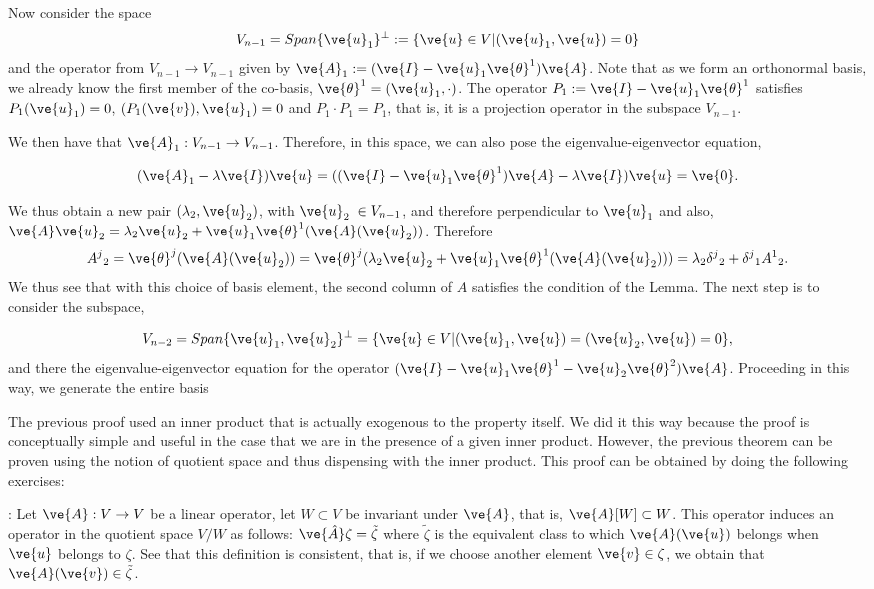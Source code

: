 Now consider the space 
\[
V_{n-1} = Span\{\ve{u}_1\}^{\perp} := \{\ve{u} \in V | (\ve{u}_1,\ve{u}) = 0 \}
\]
and the operator from $V_{n-1} \to V_{n-1}$ given by $\ve{A}_1 :=(\ve{I} - \ve{u}_1 \ve{\theta}^1)\ve{A}$.
%
Note that as we form an orthonormal basis, we already know the first member of the co-basis, $\ve{\theta}^1 = (\ve{u}_1,\cdot)$.
%
The operator $P_1:=\ve{I} - \ve{u}_1 \ve{\theta}^1$ satisfies $P_1(\ve{u}_1)=0$, 
$(P_1(\ve{v}),\ve{u}_1)=0$ and $P_1\cdot P_1 = P_1$, that is, it is a projection operator in the subspace $V_{n-1}$.

We then have that $\ve{A}_1 : V_{n-1} \to V_{n-1}$. Therefore, in this space, we can also pose the eigenvalue-eigenvector equation, 

\begin{equation}
(\ve{A}_1 - \lambda \ve{I})\ve{u} = ((\ve{I} - \ve{u}_1 \ve{\theta}^1)\ve{A} - \lambda \ve{I})\ve{u} = \ve{0}.
\end{equation}
%

We thus obtain a new pair $(\lambda_2,\ve{u}_2)$, with $\ve{u}_2 \;\in V_{n-1}$, and therefore perpendicular
to $\ve{u}_1$ and also,
$\ve{A} \ve{u}_2 = \lambda_2 \ve{u}_2 + \ve{u}_1 \ve{\theta}^1(\ve{A}(\ve{u}_2))$.
Therefore 
\[
A^j{}_2 = \ve{\theta}^j(\ve{A}(\ve{u}_2))
         = \ve{\theta}^j(\lambda_2 \ve{u}_2 + \ve{u}_1 \ve{\theta}^1(\ve{A}(\ve{u}_2)))
         = \lambda_2 \delta^j{}_2 + \delta^j{}_1 A^1{}_2.
\]
%
We thus see that with this choice of basis element, the second column of $A$ satisfies the condition of the Lemma.
The next step is to consider the subspace,

\[
V_{n-2} = Span\{\ve{u}_1, \ve{u}_2\}^{\perp}
        = \{\ve{u} \in V | (\ve{u}_1,\ve{u}) = (\ve{u}_2,\ve{u}) = 0 \},
\]
%
and there the eigenvalue-eigenvector equation for the operator
$(\ve{I} - \ve{u}_1 \ve{\theta}^1 - \ve{u}_2 \ve{\theta}^2)\ve{A}$.
Proceeding in this way, we generate the entire basis\epru
\espa

The previous proof used an inner product that is actually exogenous to the property itself.
We did it this way because the proof is conceptually simple and useful in the case that we are in the presence of a given inner product.
However, the previous theorem can be proven using the notion of quotient space and thus dispensing with the inner product. 
This proof can be obtained by doing the following exercises:

\ejer: Let $\ve{A}: V \to V$ be a linear operator, let $W\subset V$ be invariant under $\ve{A}$, that is, $\ve{A}[W]\subset W$.
This operator induces an operator in the quotient space $V/W$ as follows: 
$\ve{\hat{A}}\zeta = \tilde{\zeta}$ where $\tilde{\zeta}$ is the equivalent class to which $\ve{A}(\ve{u})$ belongs when $\ve{u}$ belongs to $\zeta$. See that this definition is consistent, that is, if we choose another element $\ve{v} \in \zeta$, we obtain that $\ve{A}(\ve{v}) \in \tilde{\zeta}$.

